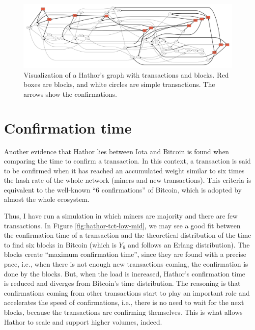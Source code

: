 \begin{figure}[!htb]
\centering\includegraphics[width=\textwidth]{./images01/sim/hathor.pdf}
\caption{Visualization of a Hathor's graph with transactions and blocks. Red boxes are blocks, and white circles are simple transactions. The arrows show the confirmations.\label{fig:hathor-dag}}
\end{figure}


\section{Confirmation time}

Another evidence that Hathor lies between Iota and Bitcoin is found when comparing the time to confirm a transaction. In this context, a transaction is said to be confirmed when it has reached an accumulated weight similar to six times the hash rate of the whole network (miners and new transactions). This criteria is equivalent to the well-known ``6 confirmations'' of Bitcoin, which is adopted by almost the whole ecosystem.

Thus, I have run a simulation in which miners are majority and there are few transactions. In Figure \ref{fig:hathor-tct-low-mid}, we may see a good fit between the confirmation time of a transaction and the theoretical distribution of the time to find six blocks in Bitcoin (which is $Y_6$ and follows an Erlang distribution). The blocks create ``maximum confirmation time'', since they are found with a precise pace, i.e., when there is not enough new transactions coming, the confirmation is done by the blocks. But, when the load is increased, Hathor's confirmation time is reduced and diverges from Bitcoin's time distribution. The reasoning is that confirmations coming from other transactions start to play an important role and accelerates the speed of confirmations, i.e., there is no need to wait for the next blocks, because the transactions are confirming themselves. This is what allows Hathor to scale and support higher volumes, indeed.

